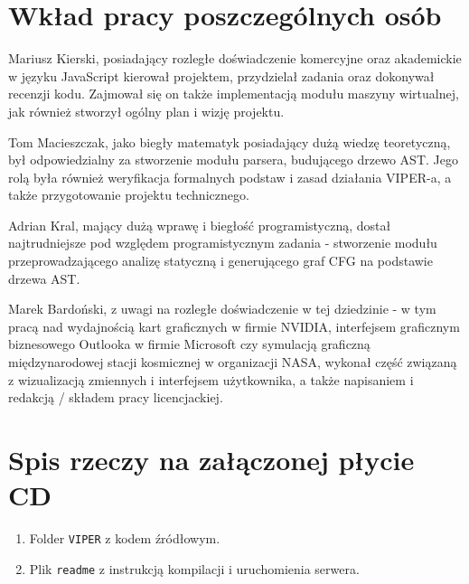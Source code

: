 \documentclass[a4paper,twoside,openright,11pt]{report}
\begin{document}
  \chapter {Wkład pracy poszczególnych osób}
\par Mariusz Kierski, posiadający rozległe doświadczenie komercyjne oraz akademickie w języku JavaScript kierował projektem, przydzielał zadania oraz dokonywał recenzji kodu. Zajmował się on także implementacją modułu maszyny wirtualnej, jak również stworzył ogólny plan i wizję projektu.
\par Tom Macieszczak, jako biegły matematyk posiadający dużą wiedzę teoretyczną, był odpowiedzialny za stworzenie modułu parsera, budującego drzewo AST. Jego rolą była również weryfikacja formalnych podstaw i zasad działania VIPER-a, a także przygotowanie projektu technicznego.
\par Adrian Kral, mający dużą wprawę i biegłość programistyczną, dostał najtrudniejsze pod względem programistycznym zadania - stworzenie modułu przeprowadzającego analizę statyczną i generującego graf CFG na podstawie drzewa AST.  
\par Marek Bardoński, z uwagi na rozległe doświadczenie w tej dziedzinie - w tym pracą nad wydajnością kart graficznych w firmie NVIDIA, interfejsem graficznym biznesowego Outlooka w firmie Microsoft czy symulacją graficzną międzynarodowej stacji kosmicznej w organizacji NASA, wykonał część związaną z wizualizacją zmiennych i interfejsem użytkownika, a także napisaniem i redakcją / składem pracy licencjackiej.

  \chapter {Spis rzeczy na załączonej płycie CD}
  \begin {enumerate}
    \item Folder \texttt{VIPER} z kodem źródłowym.
    \item Plik \texttt{readme} z instrukcją kompilacji i uruchomienia serwera.
  \end {enumerate}
  
\end{document}
